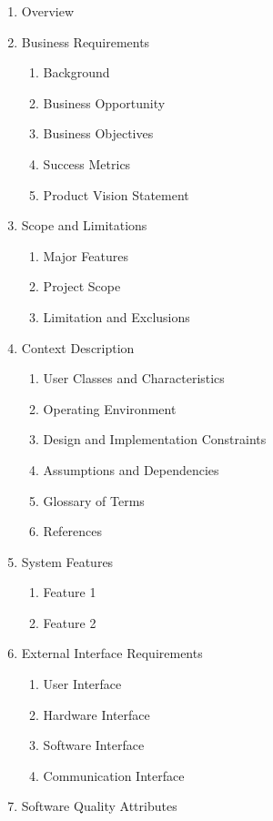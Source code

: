 \begin{enumerate}
\def\labelenumi{\arabic{enumi}.}
\item
  Overview
\item
  Business Requirements

  \begin{enumerate}
  \def\labelenumii{\alph{enumii}.}
  \item
    Background
  \item
    Business Opportunity
  \item
    Business Objectives
  \item
    Success Metrics
  \item
    Product Vision Statement
  \end{enumerate}
\item
  Scope and Limitations

  \begin{enumerate}
  \def\labelenumii{\alph{enumii}.}
  \item
    Major Features
  \item
    Project Scope
  \item
    Limitation and Exclusions
  \end{enumerate}
\item
  Context Description

  \begin{enumerate}
  \def\labelenumii{\alph{enumii}.}
  \item
    User Classes and Characteristics
  \item
    Operating Environment
  \item
    Design and Implementation Constraints
  \item
    Assumptions and Dependencies
  \item
    Glossary of Terms
  \item
    References
  \end{enumerate}
\item
  System Features

  \begin{enumerate}
  \def\labelenumii{\alph{enumii}.}
  \item
    Feature 1
  \item
    Feature 2
  \end{enumerate}
\item
  External Interface Requirements

  \begin{enumerate}
  \def\labelenumii{\alph{enumii}.}
  \item
    User Interface
  \item
    Hardware Interface
  \item
    Software Interface
  \item
    Communication Interface
  \end{enumerate}
\item
  Software Quality Attributes


\end{enumerate}

